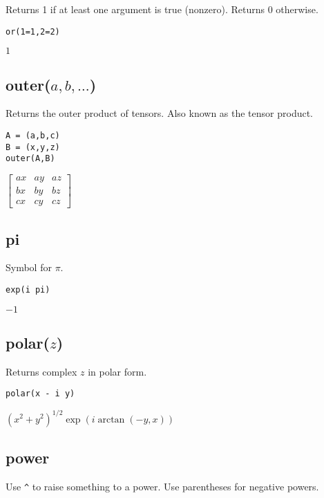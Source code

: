 Returns 1 if at least one argument is true (nonzero).
Returns 0 otherwise.

{\color{blue}
\begin{verbatim}
or(1=1,2=2)
\end{verbatim}
}

\noindent
$1$

\subsection*{outer($a,b,\ldots$)}

Returns the outer product of tensors.
Also known as the tensor product.

{\color{blue}
\begin{verbatim}
A = (a,b,c)
B = (x,y,z)
outer(A,B)
\end{verbatim}
}

\noindent
$\displaystyle
\begin{bmatrix}
a x & a y & a z\\
b x & b y & b z\\
c x & c y & c z
\end{bmatrix}
$

\subsection*{pi}

Symbol for $\pi$.

{\color{blue}
\begin{verbatim}
exp(i pi)
\end{verbatim}
}

\noindent
$-1$

\subsection*{polar($z$)}

Returns complex $z$ in polar form.

{\color{blue}
\begin{verbatim}
polar(x - i y)
\end{verbatim}
}

\noindent
$\displaystyle (x^2+y^2)^{1/2}\exp(i\arctan(-y,x))$

\subsection*{power}

Use \verb$^$ to raise something to a power.
Use parentheses for negative powers.

